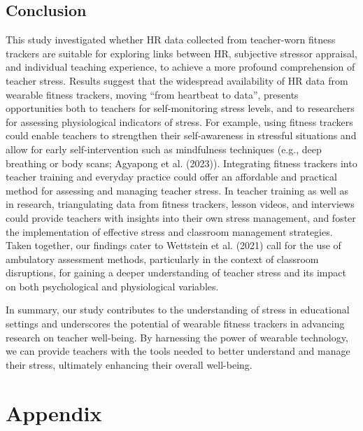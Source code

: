 \documentclass[preprint,
3p]{elsarticle} %
\begin{document}
\subsection{Conclusion}\label{conclusion}

This study investigated whether HR data collected from teacher-worn
fitness trackers are suitable for exploring links between HR, subjective
stressor appraisal, and individual teaching experience, to achieve a
more profound comprehension of teacher stress. Results suggest that the
widespread availability of HR data from wearable fitness trackers,
moving ``from heartbeat to data'', presents opportunities both to
teachers for self-monitoring stress levels, and to researchers for
assessing physiological indicators of stress. For example, using fitness
trackers could enable teachers to strengthen their self-awareness in
stressful situations and allow for early self-intervention such as
mindfulness techniques (e.g., deep breathing or body scans; Agyapong et
al. (2023)). Integrating fitness trackers into teacher training and
everyday practice could offer an affordable and practical method for
assessing and managing teacher stress. In teacher training as well as in
research, triangulating data from fitness trackers, lesson videos, and
interviews could provide teachers with insights into their own stress
management, and foster the implementation of effective stress and
classroom management strategies. Taken together, our findings cater to
Wettstein et al. (2021) call for the use of ambulatory assessment
methods, particularly in the context of classroom disruptions, for
gaining a deeper understanding of teacher stress and its impact on both
psychological and physiological variables.

In summary, our study contributes to the understanding of stress in
educational settings and underscores the potential of wearable fitness
trackers in advancing research on teacher well-being. By harnessing the
power of wearable technology, we can provide teachers with the tools
needed to better understand and manage their stress, ultimately
enhancing their overall well-being.

\newpage

\appendix
\section*{Appendix}

\setcounter{figure}{0}  %

\setcounter{table}{0}
\end{document}
